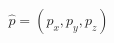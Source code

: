 \documentclass[preview]{standalone}
\begin{document}
\begin{align*}
\hat{p}=(p_x, p_y, p_z)
\end{align*}
\end{document}
